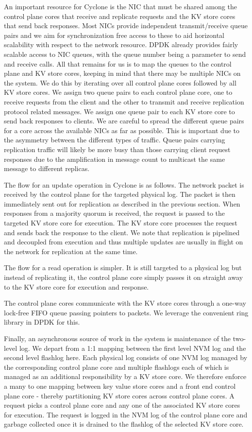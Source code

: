 \documentclass[pageno]{jpaper}
\begin{document}
An important resource for Cyclone is the NIC that must be shared among the
control plane cores that receive and replicate requests and the KV store cores
that send back responses. Most NICs provide independent transmit/receive queue
pairs and we aim for synchronization free access to these to aid horizontal
scalability with respect to the network resource. DPDK already provides fairly
scalable access to NIC queues, with the queue number being a parameter to send
and receive calls. All that remains for us is to map the queues to the control
plane and KV store cores, keeping in mind that there may be multiple NICs on the
system. We do this by iterating over all control plane cores followed by all KV
store cores. We assign two queue pairs to each control plane core, one to
receive requests from the client and the other to transmit and receive
replication protocol related messages. We assign one queue pair to each KV store
core to send back responses to clients. We are careful to spread the different
queue pairs for a core across the available NICs as far as possible. This is
important due to the asymmetry between the different types of traffic. Queue
pairs carrying replication traffic will likely be more busy than those carrying
client request responses due to the amplification in message count to multicast
the same message to different replicas.

The flow for an update operation in Cyclone is as follows. The network packet is
received by the control plane for the targeted physical log. The packet is then
immediately sent out for replication as described in the previous section. When
responses from a majority quorum is received, the request is passed to the
targeted KV store core for execution. The KV store core processes the request
and sends back the response to the client. We note that replication is pipelined
and decoupled from execution and thus multiple updates are usually in flight on
the network for replication at the same time.

The flow for a read operation is simpler. It is still targeted to a physical log
but instead of replicating it, the control plane core simply passes it on
straight away to the KV store core for execution and response.

The control plane cores communicate with the KV store cores through a one-way
lock-free FIFO queue passing pointers to packets. We leverage the convenient
ring library in DPDK for this.

Finally, an asynchronous source of work in the system is maintenance of the
two-level log. We depart from a 1:1 mapping between the first level NVM log and
the second level flashlog here. Each physical log consists of one NVM log
managed by the corresponding control plane core and multiple flashlogs each of
which is managed as an additional responsibility by a KV store core. We
therefore enforce a many to one mapping between key value store cores and a
front end control plane core - thereby partitioning KV store cores across
control plane cores. A request picks a control plane core and any one of the
associated KV store cores for execution. The request is logged in the NVM log of
the control plane core and garbage collected once it is drained to the flashlog
of the selected KV store core.
\end{document}
